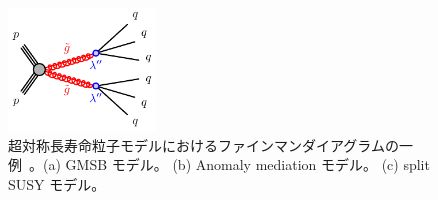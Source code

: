 \begin{figure}[H]
    \begin{minipage}{0.98\hsize}
    \centering
    \includegraphics[width=0.35\textwidth]{img/diagram/gogo-3q3q-RPV.pdf}
    \subcaption{}
    \end{minipage}
    \caption[超対称長寿命粒子モデルにおけるファインマンダイアグラムの一例]{超対称長寿命粒子モデルにおけるファインマンダイアグラムの一例~\cite{URL:03}。(a) GMSB モデル。 (b) Anomaly mediation モデル。 (c) split SUSY モデル。}
    \label{fig:dia}
\end{figure}



